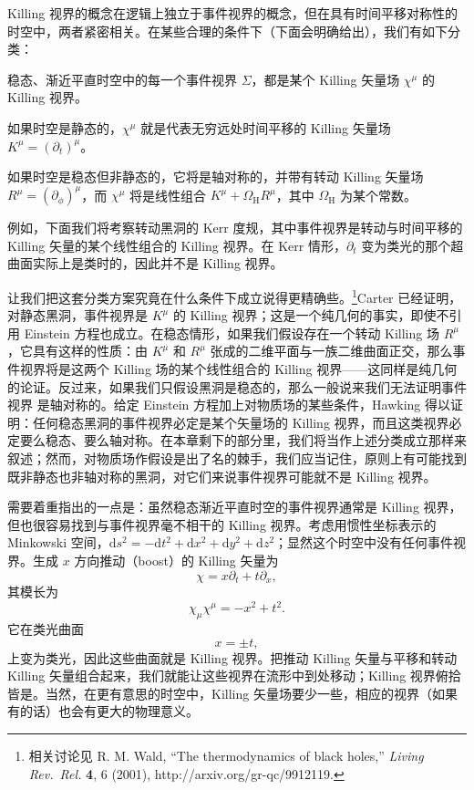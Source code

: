 Killing 视界的概念在逻辑上独立于事件视界的概念，但在具有时间平移对称性的时空中，两者紧密相关。在某些合理的条件下（下面会明确给出），我们有如下分类：

稳态、渐近平直时空中的每一个事件视界 $\Sigma$，都是某个 Killing 矢量场 $\chi^{\mu}$ 的 Killing 视界。

如果时空是静态的，$\chi^{\mu}$ 就是代表无穷远处时间平移的 Killing 矢量场 $K^{\mu}=(\partial_t)^{\mu}$。

如果时空是稳态但非静态的，它将是轴对称的，并带有转动 Killing 矢量场 $R^{\mu}=(\partial_\phi)^{\mu}$，而 $\chi^{\mu}$ 将是线性组合 $K^{\mu}+\Omega_{\mathrm{H}}R^{\mu}$，其中 $\Omega_{\mathrm{H}}$ 为某个常数。

例如，下面我们将考察转动黑洞的 Kerr 度规，其中事件视界是转动与时间平移的 Killing 矢量的某个线性组合的 Killing 视界。在 Kerr 情形，$\partial_t$ 变为类光的那个超曲面实际上是类时的，因此并不是 Killing 视界。

让我们把这套分类方案究竟在什么条件下成立说得更精确些。\footnote{相关讨论见 R. M. Wald, “The thermodynamics of black holes,” \emph{Living Rev.\ Rel.} \textbf{4}, 6 (2001), http://arxiv.org/gr-qc/9912119.}Carter 已经证明，对静态黑洞，事件视界是 $K^{\mu}$ 的 Killing 视界；这是一个纯几何的事实，即使不引用 Einstein 方程也成立。在稳态情形，如果我们假设存在一个转动 Killing 场 $R^{\mu}$，它具有这样的性质：由 $K^{\mu}$ 和 $R^{\mu}$ 张成的二维平面与一族二维曲面正交，那么事件视界将是这两个 Killing 场的某个线性组合的 Killing 视界——这同样是纯几何的论证。反过来，如果我们只假设黑洞是稳态的，那么一般说来我们无法证明事件视界
是轴对称的。给定 Einstein 方程加上对物质场的某些条件，Hawking 得以证明：任何稳态黑洞的事件视界必定是某个矢量场的 Killing 视界，而且这类视界必定要么稳态、要么轴对称。在本章剩下的部分里，我们将当作上述分类成立那样来叙述；然而，对物质场作假设是出了名的棘手，我们应当记住，原则上有可能找到既非静态也非轴对称的黑洞，对它们来说事件视界可能就不是 Killing 视界。

需要着重指出的一点是：虽然稳态渐近平直时空的事件视界通常是 Killing 视界，但也很容易找到与事件视界毫不相干的 Killing 视界。考虑用惯性坐标表示的 Minkowski 空间，$\mathrm{d}s^{2}=-\mathrm{d}t^{2}+\mathrm{d}x^{2}+\mathrm{d}y^{2}+\mathrm{d}z^{2}$；显然这个时空中没有任何事件视界。生成 $x$ 方向推动（boost）的 Killing 矢量为
\begin{equation*}
\chi = x\partial_t + t\partial_x,
\tag{6.5}
\end{equation*}
其模长为
\begin{equation*}
\chi_\mu\chi^\mu = -x^{2} + t^{2}.
\tag{6.6}
\end{equation*}
它在类光曲面
\begin{equation*}
x = \pm t,
\tag{6.7}
\end{equation*}
上变为类光，因此这些曲面就是 Killing 视界。把推动 Killing 矢量与平移和转动 Killing 矢量组合起来，我们就能让这些视界在流形中到处移动；Killing 视界俯拾皆是。当然，在更有意思的时空中，Killing 矢量场要少一些，相应的视界（如果有的话）也会有更大的物理意义。

